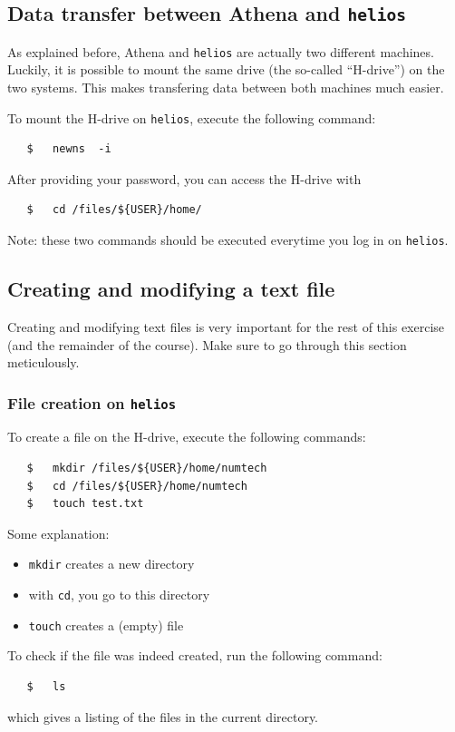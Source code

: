 \documentclass[a4paper]{article}
\begin{document}
\subsection{Data transfer between Athena and \texttt{helios}}
%
\par
As explained before, Athena and \texttt{helios} are actually two different machines. Luckily, it is possible to mount the same drive (the so-called ``H-drive'') on the two systems. This makes transfering data between both machines much easier.
%
\par
To mount the H-drive on \texttt{helios}, execute the following command:
%
\begin{verbatim}
   $   newns  -i
\end{verbatim}
%
After providing your password, you can access the H-drive with
%
\begin{verbatim}
   $   cd /files/${USER}/home/
\end{verbatim}
%
Note: these two commands should be executed everytime you log in on \texttt{helios}.
%
\subsection{Creating and modifying a text file}
%
\par
Creating and modifying text files is very important for the rest of this exercise (and the remainder of the course). Make sure to go through this section meticulously.
%
\subsubsection{File creation on \texttt{helios}}
%
\par
To create a file on the H-drive, execute the following commands:
%
\begin{verbatim}
   $   mkdir /files/${USER}/home/numtech
   $   cd /files/${USER}/home/numtech
   $   touch test.txt
\end{verbatim}
%
Some explanation:
%
\begin{itemize}
	\item \texttt{mkdir} creates a new directory
	\item with \texttt{cd}, you go to this directory
	\item \texttt{touch} creates a (empty) file
\end{itemize}
%
To check if the file was indeed created, run the following command:
%
\begin{verbatim}
   $   ls
\end{verbatim}
%
which gives a listing of the files in the current directory.
%
\end{document}
